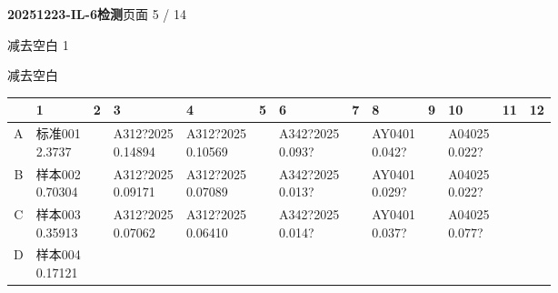 \documentclass[UTF8,10pt,a4paper,fontset=fandol]{ctexart}
\begin{document}

\newpage

\noindent\textbf{20251223-IL-6检测}\hfill 页面 5 / 14

\medskip
{}

\noindent\quad 减去空白 1

\medskip
{}

\noindent\quad 减去空白

\medskip

\begin{center}
\scriptsize
\begin{tabular}{c|p{0.62cm}|p{0.62cm}|p{0.62cm}|p{0.62cm}|p{0.62cm}|p{0.62cm}|p{0.62cm}|p{0.62cm}|p{0.62cm}|p{0.62cm}|p{0.62cm}|p{0.62cm}}
 & 1 & 2 & 3 & 4 & 5 & 6 & 7 & 8 & 9 & 10 & 11 & 12\\ \hline
A &
\shortstack[l]{标准001\\2.3737} &
&
\shortstack[l]{A312?2025\\0.14894} &
\shortstack[l]{A312?2025\\0.10569} &
&
\shortstack[l]{A342?2025\\0.093?} &
&
\shortstack[l]{AY0401\\0.042?} &
&
\shortstack[l]{A04025\\0.022?} &
& \\ \hline
B &
\shortstack[l]{样本002\\0.70304} &
&
\shortstack[l]{A312?2025\\0.09171} &
\shortstack[l]{A312?2025\\0.07089} &
&
\shortstack[l]{A342?2025\\0.013?} &
&
\shortstack[l]{AY0401\\0.029?} &
&
\shortstack[l]{A04025\\0.022?} &
& \\ \hline
C &
\shortstack[l]{样本003\\0.35913} &
&
\shortstack[l]{A312?2025\\0.07062} &
\shortstack[l]{A312?2025\\0.06410} &
&
\shortstack[l]{A342?2025\\0.014?} &
&
\shortstack[l]{AY0401\\0.037?} &
&
\shortstack[l]{A04025\\0.077?} &
& \\ \hline
D &
\shortstack[l]{样本004\\0.17121} &

\end{tabular}
\end{center}
\end{document}
